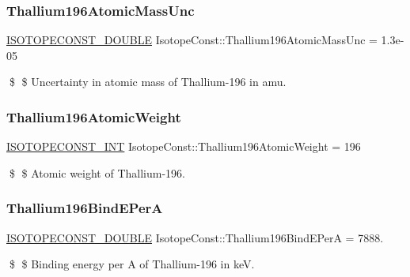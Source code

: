 \subsubsection{\texorpdfstring{Thallium196\+Atomic\+Mass\+Unc}{Thallium196AtomicMassUnc}}
{\footnotesize\ttfamily \mbox{\hyperlink{group___isotope_const-_macros_ga8f45a7272ce02c0b4c65c44636ed719a}{I\+S\+O\+T\+O\+P\+E\+C\+O\+N\+S\+T\+\_\+\+D\+O\+U\+B\+LE}} Isotope\+Const\+::\+Thallium196\+Atomic\+Mass\+Unc = 1.\+3e-\/05}

\$ \$ Uncertainty in atomic mass of Thallium-\/196 in amu. \mbox{\label{group___isotope_const-_thallium-_tl196_ga0e7401a0358ca0b4bfbe06f409ebef77}} 
\subsubsection{\texorpdfstring{Thallium196\+Atomic\+Weight}{Thallium196AtomicWeight}}
{\footnotesize\ttfamily \mbox{\hyperlink{group___isotope_const-_macros_ga5f18360b3e99483a35c32d789e62621c}{I\+S\+O\+T\+O\+P\+E\+C\+O\+N\+S\+T\+\_\+\+I\+NT}} Isotope\+Const\+::\+Thallium196\+Atomic\+Weight = 196}

\$ \$ Atomic weight of Thallium-\/196. \mbox{\label{group___isotope_const-_thallium-_tl196_ga216b71f739f0b147fa33e7393f914c34}} 
\subsubsection{\texorpdfstring{Thallium196\+Bind\+E\+PerA}{Thallium196BindEPerA}}
{\footnotesize\ttfamily \mbox{\hyperlink{group___isotope_const-_macros_ga8f45a7272ce02c0b4c65c44636ed719a}{I\+S\+O\+T\+O\+P\+E\+C\+O\+N\+S\+T\+\_\+\+D\+O\+U\+B\+LE}} Isotope\+Const\+::\+Thallium196\+Bind\+E\+PerA = 7888.}

\$ \$ Binding energy per A of Thallium-\/196 in keV. \mbox{\label{group___isotope_const-_thallium-_tl196_ga0815b537f8cc77bed01711b7e6e9f3bf}} 
